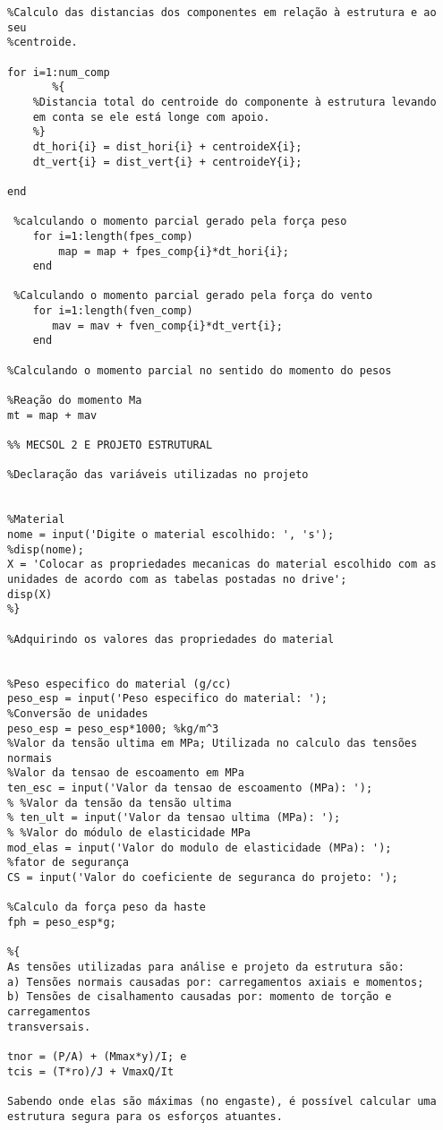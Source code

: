 \begin{anexosenv}
\begin{lstlisting}
%Calculo das distancias dos componentes em relação à estrutura e ao seu
%centroide. 

for i=1:num_comp
       %{
    %Distancia total do centroide do componente à estrutura levando 
    em conta se ele está longe com apoio.
    %}
    dt_hori{i} = dist_hori{i} + centroideX{i}; 
    dt_vert{i} = dist_vert{i} + centroideY{i};
    
end
   
 %calculando o momento parcial gerado pela força peso
    for i=1:length(fpes_comp)
        map = map + fpes_comp{i}*dt_hori{i};
    end
 
 %Calculando o momento parcial gerado pela força do vento
    for i=1:length(fven_comp)
       mav = mav + fven_comp{i}*dt_vert{i};
    end

%Calculando o momento parcial no sentido do momento do pesos

%Reação do momento Ma
mt = map + mav

%% MECSOL 2 E PROJETO ESTRUTURAL

%Declaração das variáveis utilizadas no projeto


%Material
nome = input('Digite o material escolhido: ', 's');
%disp(nome);
X = 'Colocar as propriedades mecanicas do material escolhido com as unidades de acordo com as tabelas postadas no drive';
disp(X)
%}

%Adquirindo os valores das propriedades do material


%Peso especifico do material (g/cc)
peso_esp = input('Peso especifico do material: ');
%Conversão de unidades 
peso_esp = peso_esp*1000; %kg/m^3
%Valor da tensão ultima em MPa; Utilizada no calculo das tensões normais
%Valor da tensao de escoamento em MPa
ten_esc = input('Valor da tensao de escoamento (MPa): ');
% %Valor da tensão da tensão ultima
% ten_ult = input('Valor da tensao ultima (MPa): ');
% %Valor do módulo de elasticidade MPa
mod_elas = input('Valor do modulo de elasticidade (MPa): ');
%fator de segurança
CS = input('Valor do coeficiente de seguranca do projeto: '); 

%Calculo da força peso da haste
fph = peso_esp*g;

%{
As tensões utilizadas para análise e projeto da estrutura são:
a) Tensões normais causadas por: carregamentos axiais e momentos;
b) Tensões de cisalhamento causadas por: momento de torção e carregamentos
transversais. 

tnor = (P/A) + (Mmax*y)/I; e 
tcis = (T*ro)/J + VmaxQ/It

Sabendo onde elas são máximas (no engaste), é possível calcular uma
estrutura segura para os esforços atuantes.


\end{lstlisting}
\end{anexosenv}
